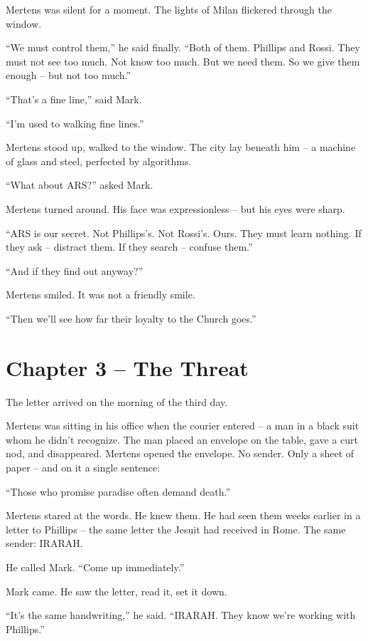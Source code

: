 \documentclass[
]{article}
\begin{document}
Mertens was silent for a moment. The lights of Milan flickered through the window.

\enquote{We must control them,} he said finally. \enquote{Both of them. Phillips and Rossi. They must not see too much. Not know too much. But we need them. So we give them enough -- but not too much.}

\enquote{That's a fine line,} said Mark.

\enquote{I'm used to walking fine lines.}

Mertens stood up, walked to the window. The city lay beneath him -- a machine of glass and steel, perfected by algorithms.

\enquote{What about ARS?} asked Mark.

Mertens turned around. His face was expressionless -- but his eyes were sharp.

\enquote{ARS is our secret. Not Phillips's. Not Rossi's. Ours. They must learn nothing. If they ask -- distract them. If they search -- confuse them.}

\enquote{And if they find out anyway?}

Mertens smiled. It was not a friendly smile.

\enquote{Then we'll see how far their loyalty to the Church goes.}

\newpage

\section{Chapter 3 -- The Threat}

The letter arrived on the morning of the third day.

Mertens was sitting in his office when the courier entered -- a man in a black suit whom he didn't recognize. The man placed an envelope on the table, gave a curt nod, and disappeared. Mertens opened the envelope. No sender. Only a sheet of paper -- and on it a single sentence:

\enquote{Those who promise paradise often demand death.}

Mertens stared at the words. He knew them. He had seen them weeks earlier in a letter to Phillips -- the same letter the Jesuit had received in Rome. The same sender: IRARAH.

He called Mark. \enquote{Come up immediately.}

Mark came. He saw the letter, read it, set it down.

\enquote{It's the same handwriting,} he said. \enquote{IRARAH. They know we're working with Phillips.}
\end{document}
